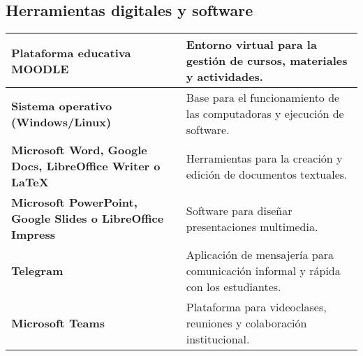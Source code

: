 \subsection*{Herramientas digitales y software}

\begin{xltabular}{\linewidth}{@{}>{\bfseries}X X@{}}
    \toprule
    Plataforma educativa MOODLE & Entorno virtual para la gestión de cursos, materiales y actividades. \\
    \midrule
    Sistema operativo (Windows/Linux) & Base para el funcionamiento de las computadoras y ejecución de software. \\
    \midrule
    Microsoft Word, Google Docs, LibreOffice Writer o LaTeX & Herramientas para la creación y edición de documentos textuales. \\
    \midrule
    Microsoft PowerPoint, Google Slides o LibreOffice Impress & Software para diseñar presentaciones multimedia. \\
    \midrule
    Telegram & Aplicación de mensajería para comunicación informal y rápida con los estudiantes. \\
    \midrule
    Microsoft Teams & Plataforma para videoclases, reuniones y colaboración institucional. \\
    \bottomrule
\end{xltabular}
\pagebreak